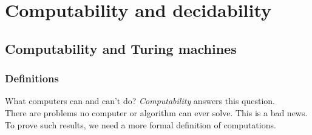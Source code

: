 \chapter{Computability and decidability}

\section{Computability and Turing machines}

\subsection{Definitions}
What computers can and can't do? \emph{Computability} answers this question.\\
There are problems no computer or algorithm can ever solve. This is a bad news.\\
To prove such results, we need a more formal definition of computations.

